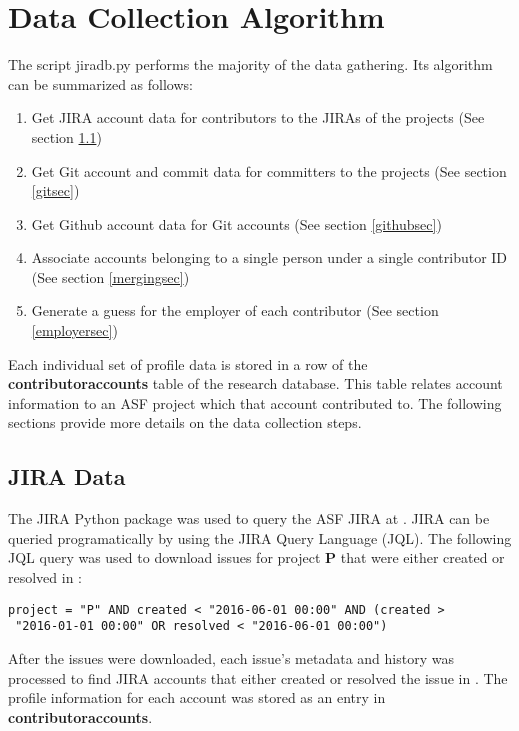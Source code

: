 \section{Data Collection Algorithm}
The script jiradb.py performs the majority of the data gathering. Its algorithm can be summarized as follows:
\begin{enumerate}
	\item Get JIRA account data for contributors to the JIRAs of the projects (See section \ref{jirasec})
	\item Get Git account and commit data for committers to the projects (See section \ref{gitsec})
	\item Get Github account data for Git accounts (See section \ref{githubsec})
	\item Associate accounts belonging to a single person under a single contributor ID (See section \ref{mergingsec})   
	\item Generate a guess for the employer of each contributor (See section \ref{employersec})   
\end{enumerate}

Each individual set of profile data is stored in a row of the \textbf{contributoraccounts} table of the research database. This table relates account information to an ASF project which that account contributed to. The following sections provide more details on the data collection steps.

\subsection{JIRA Data}\label{jirasec}
 
 
The JIRA Python package was used to query the ASF JIRA at \ASFJIRAURL. JIRA can be queried programatically by using the JIRA Query Language (JQL). The following JQL query was used to download issues for project \textbf{P} that were either created or resolved in \timeperiod:
\begin{lstlisting}
project = "P" AND created < "2016-06-01 00:00" AND (created >
 "2016-01-01 00:00" OR resolved < "2016-06-01 00:00")
\end{lstlisting}
After the issues were downloaded, each issue's metadata and history was processed to find JIRA accounts that either created or resolved the issue in \timeperiod. The profile information for each account was stored as an entry in \textbf{contributoraccounts}.
